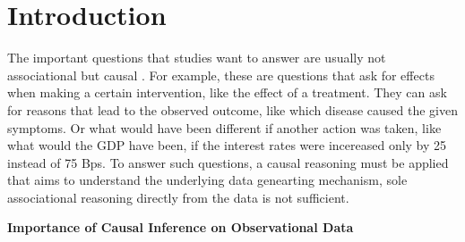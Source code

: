 




\chapter{Introduction}


The important questions that studies want to answer are usually not associational but causal \citep{pearl2009}. For example, these are questions that ask for effects when making a certain intervention, like the effect of a treatment. They can ask for reasons that lead to the observed outcome, like which disease caused the given symptoms. Or what would have been different if another action was taken, like what would the GDP have been, if the interest rates were incereased only by 25 instead of 75 Bps. To answer such questions, a causal reasoning must be applied that aims to understand the underlying data genearting mechanism, sole associational reasoning directly from the data is not sufficient. 




\textbf{Importance of Causal Inference on Observational Data}


